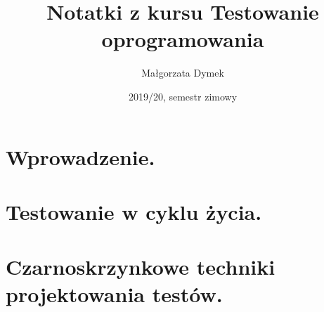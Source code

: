 \documentclass[a4paper]{article}
\title{Notatki z kursu Testowanie oprogramowania}
\author{Małgorzata Dymek}
\date{2019/20, semestr zimowy}
\begin{document}
    \maketitle

    \section{Wprowadzenie.}
    

    \section{Testowanie w cyklu życia.}
    

    \section{Czarnoskrzynkowe techniki projektowania testów.}
    
    
\end{document}
